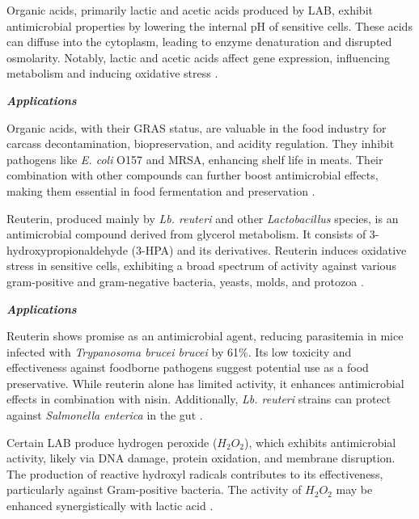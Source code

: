 Organic acids, primarily lactic and acetic acids produced by LAB, exhibit antimicrobial properties by lowering the internal pH of sensitive cells. These acids can diffuse into the cytoplasm, leading to enzyme denaturation and disrupted osmolarity. Notably, lactic and acetic acids affect gene expression, influencing metabolism and inducing oxidative stress \cite*{L10-MicroFunct}.

\vspace{0.5em}
\textbf{\textit{Applications}}
\vspace{0.5em}

Organic acids, with their GRAS status, are valuable in the food industry for carcass decontamination, biopreservation, and acidity regulation. They inhibit pathogens like\textit{ E. coli} O157 and MRSA, enhancing shelf life in meats. Their combination with other compounds can further boost antimicrobial effects, making them essential in food fermentation and preservation \cite*{L10-MicroFunct}.

Reuterin, produced mainly by \textit{Lb. reuteri} and other \textit{Lactobacillus} species, is an antimicrobial compound derived from glycerol metabolism. It consists of 3-hydroxypropionaldehyde (3-HPA) and its derivatives. Reuterin induces oxidative stress in sensitive cells, exhibiting a broad spectrum of activity against various gram-positive and gram-negative bacteria, yeasts, molds, and protozoa \cite*{L10-MicroFunct}.

\vspace{0.5em}
\textbf{\textit{Applications}}
\vspace{0.5em}

Reuterin shows promise as an antimicrobial agent, reducing parasitemia in mice infected with \textit{Trypanosoma brucei brucei} by 61\%. Its low toxicity and effectiveness against foodborne pathogens suggest potential use as a food preservative. While reuterin alone has limited activity, it enhances antimicrobial effects in combination with nisin. Additionally, \textit{Lb. reuteri} strains can protect against \textit{Salmonella enterica} in the gut \cite*{L10-MicroFunct}.

Certain LAB produce hydrogen peroxide ($H_2O_2$), which exhibits antimicrobial activity, likely via DNA damage, protein oxidation, and membrane disruption. The production of reactive hydroxyl radicals contributes to its effectiveness, particularly against Gram-positive bacteria. The activity of $H_2O_2$ may be enhanced synergistically with lactic acid \cite*{L10-MicroFunct}.

